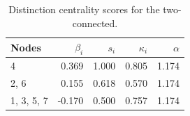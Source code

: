\begin{table}
\centering
\caption{\label{tab:twoconnected}Distinction centrality scores for the two-connected.}
\centering
\begin{tabular}[t]{lrrrr}
\toprule
Nodes & $\beta_i$ & $s_i$ & $\kappa_i$ & $\alpha$\\
\midrule
4 & 0.369 & 1.000 & 0.805 & 1.174\\
2, 6 & 0.155 & 0.618 & 0.570 & 1.174\\
1, 3, 5, 7 & -0.170 & 0.500 & 0.757 & 1.174\\
\bottomrule
\end{tabular}
\end{table}

